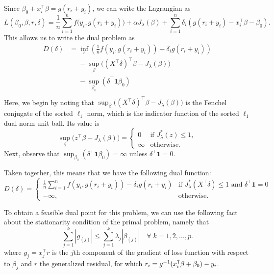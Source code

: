 \documentclass[article]{jss}
\begin{document}
Since \(\beta_0 + x_i^\intercal \beta = g(r_i + y_i)\), we can write the Lagrangian as
\[
  L(\beta_0,\beta,r,\delta) = \frac{1}{n} \sum_{i=1}^n f\big(y_i, g(r_i + y_i)\big) + \alpha J_{\lambda}(\beta) + \sum_{i=1}^n \delta_i \left(g(r_i + y_i) - x_i^\intercal \beta - \beta_0 \right).
\]
This allows us to write the dual problem as
\[
  \begin{aligned}
    D(\delta) & = \inf_r\left( \frac{1}{n} f\left(y_i, g(r_i+y_i)\right) - \delta_i g(r_i+ y_i)\right)         \\
              & \phantom{={}} - \sup_\beta \big((X^\intercal \delta)^\intercal \beta -  J_\lambda(\beta) \big) \\
              & \phantom{={}} - \sup_{\beta_0} \left( \delta^\intercal \bm{1} \beta_0\right)                   \\
  \end{aligned}
\]
Here, we begin by noting that \(\sup_\beta \big((X^\intercal
\delta)^\intercal \beta -  J_\lambda(\beta) \big)\) is the Fenchel conjugate of
the sorted \(\ell_1\) norm, which is the indicator function of the sorted
\(\ell_1\) dual norm unit ball. Its value is
\[
  \sup_\beta \big(z^\intercal \beta -  J_\lambda(\beta) \big) =
  \begin{cases}
    0      & \text{if } J^*_\lambda(z) \leq 1, \\
    \infty & \text{otherwise}.
  \end{cases}
\]
Next, observe that \(\sup_{\beta_0} (\delta^\intercal \bm{1} \beta_0) = \infty\) unless
\(\delta^\intercal \bm{1} = 0\).

Taken together, this means that we have the following dual function:
\begin{equation}
  D(\delta) = \begin{cases}
    \frac{1}{n} \sum_{i=1}^n f\left(y_i, g(r_i+y_i)\right) - \delta_i g(r_i+ y_i) & \text{if } J^*_\lambda(X^\intercal \delta) \leq 1 \text{ and } \delta^\intercal \bm{1} = 0 \\
    -\infty,                                                                      & \text{otherwise}.
  \end{cases}
\end{equation}

To obtain a feasible dual point for this problem, we can use the
following fact about the stationarity condition of the primal problem,
namely that
\[
  \sum_{j=1}^k | g_{(j)} | \leq \sum_{j=1}^k \lambda_j |\beta_{(j)}| \quad \forall\; k = 1,2,\dots,p.
\]
where  \(g_j = x_j^\intercal r\) is the \(j\)th component of the gradient of loss function
with respect to \(\beta_j\)
and \(r\) the generalized residual, for which \(r_i = g^{-1}(x_i^\intercal \beta + \beta_0) - y_i\).
\end{document}
